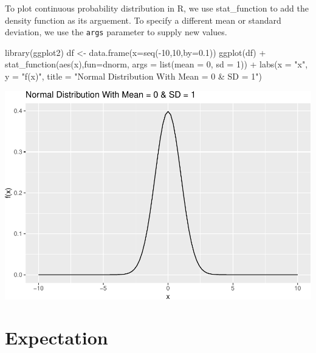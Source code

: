 \documentclass[landscape, 20pt]{extreport}
\newenvironment{Shaded}{\begin{snugshade}}{\end{snugshade}}
\newcommand{\AttributeTok}[1]{\textcolor[rgb]{0.77,0.63,0.00}{#1}}
\newcommand{\DecValTok}[1]{\textcolor[rgb]{0.00,0.00,0.81}{#1}}
\newcommand{\FloatTok}[1]{\textcolor[rgb]{0.00,0.00,0.81}{#1}}
\newcommand{\FunctionTok}[1]{\textcolor[rgb]{0.00,0.00,0.00}{#1}}
\newcommand{\NormalTok}[1]{#1}
\newcommand{\OtherTok}[1]{\textcolor[rgb]{0.56,0.35,0.01}{#1}}
\newcommand{\SpecialCharTok}[1]{\textcolor[rgb]{0.00,0.00,0.00}{#1}}
\newcommand{\StringTok}[1]{\textcolor[rgb]{0.31,0.60,0.02}{#1}}
\theoremstyle{definition}
\theoremstyle{definition}
\theoremstyle{definition}
\theoremstyle{definition}
\theoremstyle{remark}
\begin{document}
To plot continuous probability distribution in R, we use stat\_function to add the density function as its arguement. To specify a different mean or standard deviation, we use the \texttt{args} parameter to supply new values.

\begin{Shaded}
\begin{Highlighting}[]
\FunctionTok{library}\NormalTok{(ggplot2)}
\NormalTok{df }\OtherTok{\textless{}{-}} \FunctionTok{data.frame}\NormalTok{(}\AttributeTok{x=}\FunctionTok{seq}\NormalTok{(}\SpecialCharTok{{-}}\DecValTok{10}\NormalTok{,}\DecValTok{10}\NormalTok{,}\AttributeTok{by=}\FloatTok{0.1}\NormalTok{))}
\FunctionTok{ggplot}\NormalTok{(df) }\SpecialCharTok{+} 
    \FunctionTok{stat\_function}\NormalTok{(}\FunctionTok{aes}\NormalTok{(x),}\AttributeTok{fun=}\NormalTok{dnorm, }\AttributeTok{args =} \FunctionTok{list}\NormalTok{(}\AttributeTok{mean =} \DecValTok{0}\NormalTok{, }\AttributeTok{sd =} \DecValTok{1}\NormalTok{))  }\SpecialCharTok{+} 
    \FunctionTok{labs}\NormalTok{(}\AttributeTok{x =} \StringTok{"x"}\NormalTok{, }\AttributeTok{y =} \StringTok{"f(x)"}\NormalTok{, }
       \AttributeTok{title =} \StringTok{"Normal Distribution With Mean = 0 \& SD = 1"}\NormalTok{) }
\end{Highlighting}
\end{Shaded}

\includegraphics{unnamed-chunk-2-1.pdf}

\hypertarget{expectation}{%
\section{Expectation}\label{expectation}}
\end{document}
